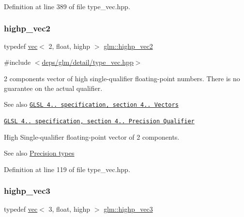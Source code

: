 Definition at line 389 of file type\+\_\+vec.\+hpp.

\mbox{\label{group__core__precision_gad588ab946806864499d6559c186ce3ba}} 
\subsubsection{\texorpdfstring{highp\+\_\+vec2}{highp\_vec2}}
{\footnotesize\ttfamily typedef \hyperlink{structglm_1_1vec}{vec}$<$ 2, float, highp $>$ \hyperlink{group__core__precision_gad588ab946806864499d6559c186ce3ba}{glm\+::highp\+\_\+vec2}}



{\ttfamily \#include $<$\hyperlink{type__vec_8hpp}{deps/glm/detail/type\+\_\+vec.\+hpp}$>$}

2 components vector of high single-\/qualifier floating-\/point numbers. There is no guarantee on the actual qualifier.

\begin{DoxySeeAlso}{See also}
\href{http://www.opengl.org/registry/doc/GLSLangSpec.4.20.8.pdf}{\tt G\+L\+SL 4.. specification, section 4.. Vectors} 

\href{http://www.opengl.org/registry/doc/GLSLangSpec.4.20.8.pdf}{\tt G\+L\+SL 4.. specification, section 4.. Precision Qualifier}
\end{DoxySeeAlso}
High Single-\/qualifier floating-\/point vector of 2 components. \begin{DoxySeeAlso}{See also}
\hyperlink{group__core__precision}{Precision types} 
\end{DoxySeeAlso}


Definition at line 119 of file type\+\_\+vec.\+hpp.

\mbox{\label{group__core__precision_ga37ff190d92f9be26223a5de4153b9133}} 
\subsubsection{\texorpdfstring{highp\+\_\+vec3}{highp\_vec3}}
{\footnotesize\ttfamily typedef \hyperlink{structglm_1_1vec}{vec}$<$ 3, float, highp $>$ \hyperlink{group__core__precision_ga37ff190d92f9be26223a5de4153b9133}{glm\+::highp\+\_\+vec3}}



